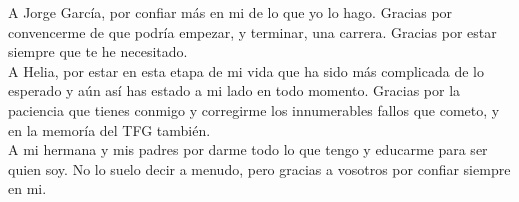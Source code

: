 A Jorge García, por confiar más en mi de lo que yo lo hago. Gracias por convencerme de que podría empezar, y terminar, una carrera. Gracias por estar siempre que te he necesitado.\\

A Helia, por estar en esta etapa de mi vida que ha sido más complicada de lo esperado y aún así has estado a mi lado en todo momento. Gracias por la paciencia que tienes conmigo y corregirme los innumerables fallos que cometo, y en la memoría del TFG también.\\

A mi hermana y mis padres por darme todo lo que tengo y educarme para ser quien soy. No lo suelo decir a menudo, pero gracias a vosotros por confiar siempre en mi.